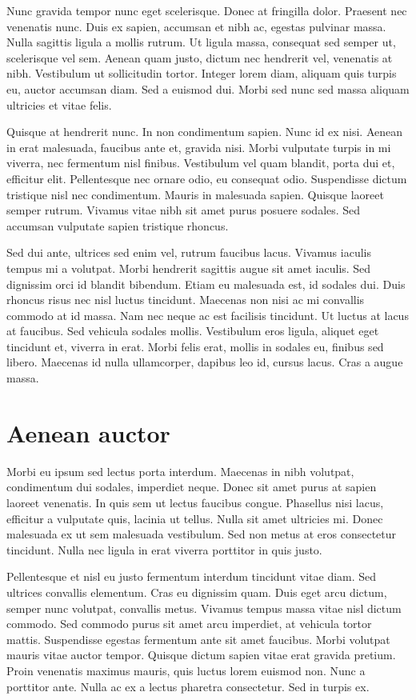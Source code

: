 Nunc gravida tempor nunc eget scelerisque. Donec at fringilla dolor. Praesent nec venenatis nunc. Duis ex sapien, accumsan et nibh ac, egestas pulvinar massa. Nulla sagittis ligula a mollis rutrum. Ut ligula massa, consequat sed semper ut, scelerisque vel sem. Aenean quam justo, dictum nec hendrerit vel, venenatis at nibh. Vestibulum ut sollicitudin tortor. Integer lorem diam, aliquam quis turpis eu, auctor accumsan diam. Sed a euismod dui. Morbi sed nunc sed massa aliquam ultricies et vitae felis.

Quisque at hendrerit nunc. In non condimentum sapien. Nunc id ex nisi. Aenean in erat malesuada, faucibus ante et, gravida nisi. Morbi vulputate turpis in mi viverra, nec fermentum nisl finibus. Vestibulum vel quam blandit, porta dui et, efficitur elit. Pellentesque nec ornare odio, eu consequat odio. Suspendisse dictum tristique nisl nec condimentum. Mauris in malesuada sapien. Quisque laoreet semper rutrum. Vivamus vitae nibh sit amet purus posuere sodales. Sed accumsan vulputate sapien tristique rhoncus.

Sed dui ante, ultrices sed enim vel, rutrum faucibus lacus. Vivamus iaculis tempus mi a volutpat. Morbi hendrerit sagittis augue sit amet iaculis. Sed dignissim orci id blandit bibendum. Etiam eu malesuada est, id sodales dui. Duis rhoncus risus nec nisl luctus tincidunt. Maecenas non nisi ac mi convallis commodo at id massa. Nam nec neque ac est facilisis tincidunt. Ut luctus at lacus at faucibus. Sed vehicula sodales mollis. Vestibulum eros ligula, aliquet eget tincidunt et, viverra in erat. Morbi felis erat, mollis in sodales eu, finibus sed libero. Maecenas id nulla ullamcorper, dapibus leo id, cursus lacus. Cras a augue massa.

\section{Aenean auctor}
Morbi eu ipsum sed lectus porta interdum. Maecenas in nibh volutpat, condimentum dui sodales, imperdiet neque. Donec sit amet purus at sapien laoreet venenatis. In quis sem ut lectus faucibus congue. Phasellus nisi lacus, efficitur a vulputate quis, lacinia ut tellus. Nulla sit amet ultricies mi. Donec malesuada ex ut sem malesuada vestibulum. Sed non metus at eros consectetur tincidunt. Nulla nec ligula in erat viverra porttitor in quis justo.

Pellentesque et nisl eu justo fermentum interdum tincidunt vitae diam. Sed ultrices convallis elementum. Cras eu dignissim quam. Duis eget arcu dictum, semper nunc volutpat, convallis metus. Vivamus tempus massa vitae nisl dictum commodo. Sed commodo purus sit amet arcu imperdiet, at vehicula tortor mattis. Suspendisse egestas fermentum ante sit amet faucibus. Morbi volutpat mauris vitae auctor tempor. Quisque dictum sapien vitae erat gravida pretium. Proin venenatis maximus mauris, quis luctus lorem euismod non. Nunc a porttitor ante. Nulla ac ex a lectus pharetra consectetur. Sed in turpis ex.

